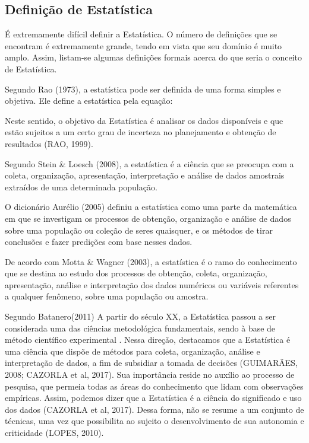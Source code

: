 \subsection{Definição de Estatística}

É extremamente difícil definir a Estatística. O número de definições
que se encontram é extremamente grande, tendo em vista que seu domínio é
muito amplo. Assim, listam-se algumas definições formais acerca do que
seria o conceito de Estatística.\vskip0.3cm

Segundo Rao (1973), a estatística pode ser definida de uma forma
simples e objetiva. Ele define a estatística pela equação:



Neste sentido, o objetivo da Estatística é analisar os dados disponíveis e que estão sujeitos a um certo grau de incerteza no planejamento e obtenção de resultados (RAO, 1999).\vskip0.3cm

Segundo Stein \& Loesch (2008), a estatística é a ciência que se preocupa com a coleta, organização, apresentação, interpretação e análise de dados amostrais extraídos de uma determinada população.

\newpage
O dicionário Aurélio (2005) definiu a estatística como uma parte da matemática em que se investigam os processos de obtenção, organização e análise de dados sobre uma população ou coleção de seres quaisquer, e os métodos de tirar conclusões e fazer predições com base nesses dados.\vskip0.3cm

De acordo com Motta \& Wagner (2003), a estatística é o ramo do conhecimento que se destina ao estudo dos processos de obtenção, coleta, organização, apresentação, análise e interpretação dos dados numéricos ou variáveis referentes a qualquer fenômeno, sobre uma população ou amostra.\vskip0.3cm

Segundo Batanero(2011) A partir do século XX, a Estatística passou a ser considerada uma das ciências metodológica fundamentais, sendo à base de método científico experimental . Nessa direção, destacamos que a Estatística é uma ciência que dispõe de métodos para coleta, organização, análise e interpretação de dados, a fim de subsidiar a tomada de decisões (GUIMARÃES, 2008; CAZORLA et al, 2017). Sua importância reside no auxílio ao processo de pesquisa, que permeia todas as áreas do conhecimento que lidam com observações empíricas. Assim, podemos dizer que a Estatística é a ciência do significado e uso dos dados (CAZORLA et al, 2017). Dessa forma, não se resume a um conjunto de técnicas, uma vez que possibilita ao sujeito o desenvolvimento de sua autonomia e criticidade (LOPES, 2010). \vskip0.3cm

